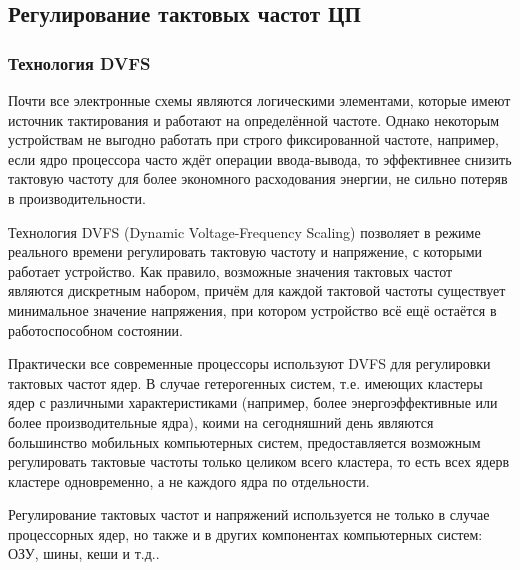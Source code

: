 

\subsection{Регулирование тактовых частот ЦП}

\subsubsection{Технология DVFS} \label{DVFS_Chapter}

    Почти все электронные схемы являются логическими элементами, которые имеют источник тактирования
    и работают на определённой частоте. Однако некоторым устройствам не выгодно работать при
    строго фиксированной частоте, например, если ядро процессора часто ждёт операции ввода-вывода,
    то эффективнее снизить тактовую частоту для более экономного расходования энергии, не сильно
    потеряв в производительности.

    Технология DVFS (Dynamic Voltage-Frequency Scaling) позволяет в режиме реального времени
    регулировать тактовую частоту и напряжение, с которыми работает устройство. Как правило,
    возможные значения тактовых частот являются дискретным набором, причём для каждой тактовой частоты
    существует минимальное значение напряжения, при котором устройство всё ещё остаётся в
    работоспособном состоянии.

    Практически все современные процессоры используют DVFS для регулировки тактовых частот ядер. В случае
    гетерогенных систем, т.е. имеющих кластеры ядер с различными характеристиками (например, более
    энергоэффективные или более производительные ядра), коими на сегодняшний день являются
    большинство мобильных компьютерных систем, предоставляется возможным регулировать тактовые частоты
    только целиком всего кластера, то есть всех ядерв кластере одновременно, а не каждого ядра по отдельности.

    Регулирование тактовых частот и напряжений используется не только в случае процессорных ядер, но также
    и в других компонентах компьютерных систем: ОЗУ, шины, кеши и т.д..

